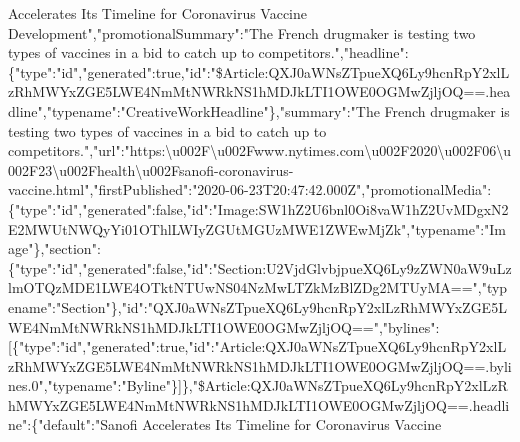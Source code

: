 Accelerates Its Timeline for Coronavirus Vaccine
Development","promotionalSummary":"The French drugmaker is testing two
types of vaccines in a bid to catch up to
competitors.","headline":\{"type":"id","generated":true,"id":"\$Article:QXJ0aWNsZTpueXQ6Ly9hcnRpY2xlLzRhMWYxZGE5LWE4NmMtNWRkNS1hMDJkLTI1OWE0OGMwZjljOQ==.headline","typename":"CreativeWorkHeadline"\},"summary":"The
French drugmaker is testing two types of vaccines in a bid to catch up
to
competitors.","url":"https:\textbackslash{}u002F\textbackslash{}u002Fwww.nytimes.com\textbackslash{}u002F2020\textbackslash{}u002F06\textbackslash{}u002F23\textbackslash{}u002Fhealth\textbackslash{}u002Fsanofi-coronavirus-vaccine.html","firstPublished":"2020-06-23T20:47:42.000Z","promotionalMedia":\{"type":"id","generated":false,"id":"Image:SW1hZ2U6bnl0Oi8vaW1hZ2UvMDgxN2E2MWUtNWQyYi01OThlLWIyZGUtMGUzMWE1ZWEwMjZk","typename":"Image"\},"section":\{"type":"id","generated":false,"id":"Section:U2VjdGlvbjpueXQ6Ly9zZWN0aW9uLzlmOTQzMDE1LWE4OTktNTUwNS04NzMwLTZkMzBlZDg2MTUyMA==","typename":"Section"\},"id":"QXJ0aWNsZTpueXQ6Ly9hcnRpY2xlLzRhMWYxZGE5LWE4NmMtNWRkNS1hMDJkLTI1OWE0OGMwZjljOQ==","bylines":{[}\{"type":"id","generated":true,"id":"Article:QXJ0aWNsZTpueXQ6Ly9hcnRpY2xlLzRhMWYxZGE5LWE4NmMtNWRkNS1hMDJkLTI1OWE0OGMwZjljOQ==.bylines.0","typename":"Byline"\}{]}\},"\$Article:QXJ0aWNsZTpueXQ6Ly9hcnRpY2xlLzRhMWYxZGE5LWE4NmMtNWRkNS1hMDJkLTI1OWE0OGMwZjljOQ==.headline":\{"default":"Sanofi
Accelerates Its Timeline for Coronavirus Vaccine
